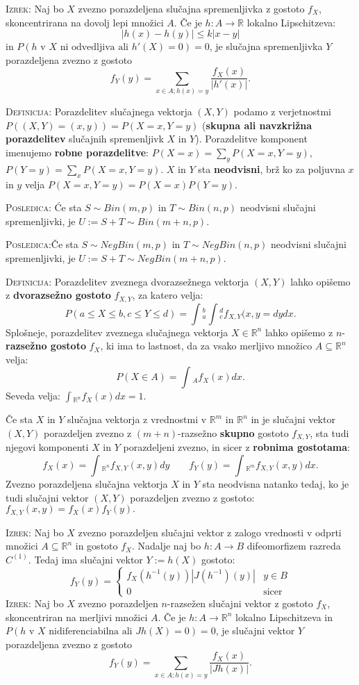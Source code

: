 \documentclass[8pt,a4paper]{amsart}
\theoremstyle{definition} %
\theoremstyle{plain} %
\let\oldint\int
\renewcommand{\int}{\oldint \!}
\newcommand{\R}{\mathbb R}
\begin{document}
\textsc{Izrek:} Naj bo $X$ zvezno porazdeljena slučajna spremenljivka z gostoto $f_X$, skoncentrirana na dovolj lepi množici $A$. Če je $h: A \longrightarrow \R$ lokalno Lipschitzeva:
$$
|h(x)-h(y)| \leq k |x-y|
$$
in $P(h\text{ v $X$ ni odvedljiva ali }h'(X)=0)=0$, je slučajna spremenljivka $Y$ porazdeljena zvezno z gostoto
$$
f_Y(y)= \sum_{x\in A;h(x)=y}\frac{f_X(x)}{|h'(x)|}.
$$

\textsc{Definicija:} Porazdelitev slučajnega vektorja $(X,Y)$ podamo z verjetnostmi $P((X,Y)=(x,y))=P(X=x,Y=y)$ (\textbf{skupna ali navzkrižna porazdelitev} slučajnih spremenljivk $X$ in $Y$). Porazdelitve komponent imenujemo \textbf{robne porazdelitve}: $P(X=x)=\sum_yP(X=x,Y=y)$, $P(Y=y)=\sum_xP(X=x, Y=y)$. $X$ in $Y$ sta \textbf{neodvisni}, brž ko za poljuvna $x$ in $y$ velja $P(X=x,Y=y)=P(X=x)P(Y=y)$.

\textsc{Posledica:} Će sta $S \sim Bin(m,p)$ in $T \sim Bin(n,p)$ neodvisni slučajni spremenljivki, je $U := S+T \sim Bin(m+n,p)$.

\textsc{Posledica:}Če sta $S \sim NegBin(m,p)$ in $T \sim NegBin(n,p)$ neodvisni slučajni spremenljivki, je $U := S+T \sim NegBin(m+n,p)$.

\textsc{Definicija:} Porazdelitev zveznega dvorazsežnega vektorja $(X,Y)$ lahko opišemo z \textbf{dvorazsežno gostoto} $f_{X,Y}$, za katero velja:
$$
P(a \leq X \leq b, c \leq Y \leq d) = \int_a^b\int_c^d f_{X,Y}(x,y=dy dx.
$$
Splošneje, porazdelitev zveznega slučajnega vektorja $X \in \R^n$ lahko opišemo z $n$-\textbf{razsežno gostoto} $f_X$, ki ima to lastnost, da za vsako merljivo množico $A \subseteq \R^n$ velja:
$$
P(X \in A) = \int_A f_X(x)dx.
$$
Seveda velja: $\int_{\R^n}f_X(x)dx=1.$

Če sta $X$ in $Y$ slučajna vektorja z vrednostmi v $\R^m$ in $\R^n$ in je slučajni vektor $(X,Y)$ porazdeljen zvezno z $(m+n)$-razsežno \textbf{skupno} gostoto $f_{X,Y}$, sta tudi njegovi komponenti $X$ in $Y$ porazdeljeni zvezno, in sicer z \textbf{robnima gostotama}:
$$
f_X(x) = \int_{\R^n}f_{X,Y}(x,y)dy \qquad f_Y(y) = \int_{\R^m}f_{X,Y}(x,y)dx.
$$
Zvezno porazdeljena slučajna vektorja $X$ in $Y$ sta neodvisna natanko tedaj, ko je tudi slučajni vektor $(X,Y)$ porazdeljen zvezno z gostoto: $f_{X,Y}(x,y) = f_X(x)f_Y(y).$

\textsc{Izrek:} Naj bo $X$ zvezno porazdeljen slučajni vektor z zalogo vrednosti v odprti množici $A \subseteq \R^n$ in gostoto $f_X$. Nadalje naj bo $h: A \longrightarrow B$ difeomorfizem razreda $C^(1)$. Tedaj ima slučajni vektor $Y:=h(X)$ gostoto:
$$
f_Y(y) = \begin{cases} f_X(h^{-1}(y))|J(h^{-1})(y)| & y\in B \\ 
0 & \mbox{sicer} \end{cases}
$$
\textsc{Izrek:} Naj bo $X$ zvezno porazdeljen $n$-razsežen slučajni vektor z gostoto $f_X$, skoncentriran na merljivi množici $A$. Če je $h: A \longrightarrow \R^n$ lokalno Lipschitzeva in $P(h\text{ v $X$ nidiferenciabilna ali }Jh(X)=0)=0$, je slučajni vektor $Y$ porazdeljena zvezno z gostoto
$$
f_Y(y)= \sum_{x\in A;h(x)=y}\frac{f_X(x)}{|Jh(x)|}.
$$
\end{document}
